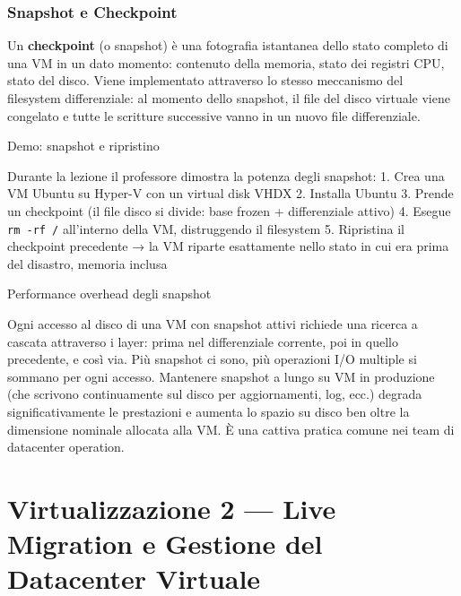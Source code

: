 \documentclass[
  italian,
  openany]{book}
\begin{document}
\subsection{Snapshot e Checkpoint}\label{snapshot-e-checkpoint}

Un \textbf{checkpoint} (o snapshot) è una fotografia istantanea dello
stato completo di una VM in un dato momento: contenuto della memoria,
stato dei registri CPU, stato del disco. Viene implementato attraverso
lo stesso meccanismo del filesystem differenziale: al momento dello
snapshot, il file del disco virtuale viene congelato e tutte le
scritture successive vanno in un nuovo file differenziale.

\begin{callouttip}{Demo: snapshot e ripristino}

Durante la lezione il professore dimostra la potenza degli snapshot: 1.
Crea una VM Ubuntu su Hyper-V con un virtual disk VHDX 2. Installa
Ubuntu 3. Prende un checkpoint (il file disco si divide: base frozen +
differenziale attivo) 4. Esegue \texttt{rm\ -rf\ /} all'interno della
VM, distruggendo il filesystem 5. Ripristina il checkpoint precedente →
la VM riparte esattamente nello stato in cui era prima del disastro,
memoria inclusa

\end{callouttip}

\begin{calloutwarning}{Performance overhead degli snapshot}

Ogni accesso al disco di una VM con snapshot attivi richiede una ricerca
a cascata attraverso i layer: prima nel differenziale corrente, poi in
quello precedente, e così via. Più snapshot ci sono, più operazioni I/O
multiple si sommano per ogni accesso. Mantenere snapshot a lungo su VM
in produzione (che scrivono continuamente sul disco per aggiornamenti,
log, ecc.) degrada significativamente le prestazioni e aumenta lo spazio
su disco ben oltre la dimensione nominale allocata alla VM. È una
cattiva pratica comune nei team di datacenter operation.

\end{calloutwarning}

\newpage

\chapter{Virtualizzazione 2 --- Live Migration e Gestione del Datacenter
Virtuale}\label{virtualizzazione-2-live-migration-e-gestione-del-datacenter-virtuale}
\end{document}
